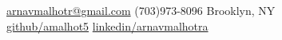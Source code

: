 \documentclass[10pt,a4paper]{article}
\begin{document}



\nobreakvspace{0.3em}  %

\noindent\href{mailto:arnavmalhotr@gmail.com}{arnavmalhotr\mbox{}@\mbox{}gmail.com}\sbull
(703)973-8096\sbull
Brooklyn, NY
\\
\href{https://github.com/amalhot5}{github/amalhot5}\sbull
\href{http://linkedin.com/in/arnavmalhotra}{linkedin/arnavmalhotra}
\\




\end{document}
